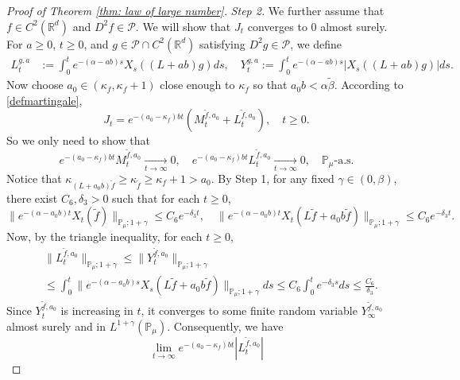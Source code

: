 \documentclass[EJP]{ejpecp} %
\begin{document}
\begin{proof}[Proof of Theorem \ref{thm: law of large number}]
  	\emph{Step 2.} We further assume that $f\in C^2(\mathbb R^d)$ and $D^2f \in \mathcal{P}$.
  	We will show that $J_t$ converges to $0$ almost surely.
	For $a \geq 0$, $ t\geq 0$, and $g\in \mathcal{P}\cap C^2(\mathbb{R}^d)$ satisfying $D^2g\in \mathcal{P}$, we define
\begin{align}
    L_t^{g,a}
    & :=\int_0^t e^{-(\alpha-ab)s}X_s((L+ab)g) ds,
    \quad
    Y_t^{g,a}
    :=\int_0^t e^{-(\alpha-ab)s}|X_s((L+ab)g)|ds.
\end{align}
	Now choose $a_0 \in (\kappa_{f}, \kappa_f + 1)$ close enough to $\kappa_f$ so that $a_0 b < \alpha \tilde \beta$.
	According to \eqref{defmartingale},
\[
    J_t
    = e^{-(a_0-\kappa_f)bt} (M_t^{\widetilde{f}, a_0}+L_t^{\widetilde{f}, a_0}),
    \quad t\geq 0.
\]
	So we only need to show that
\[
    e^{-(a_0-\kappa_f)b t}M_t^{\widetilde{f},a_0}
    \xrightarrow[t\to \infty]{} 0,
    \quad e^{-(a_0-\kappa_f)b t}L_t^{\widetilde{f},a_0}
    \xrightarrow[t\to \infty]{} 0,
    \quad \mathbb{P}_{\mu}\text{-a.s.}
\]
	Notice that $\kappa_{(L+a_0 b)\widetilde{f}}\geq \kappa_{\widetilde{f}}\geq \kappa_f+1 > a_0$.
	By Step 1, for any fixed $\gamma\in (0,\beta)$, there exist $C_6, \delta_3>0$ such that for each $t\geq 0$,
\[
    \| e^{-(\alpha-a_0 b)t} X_t(\widetilde{f})\|_{\mathbb{P}_{\mu};1+\gamma}
    \leq C_6 e^{-\delta_3 t},
    \quad \|e^{-(\alpha-a_0 b)t}X_t(L\widetilde{f}+a_0 b\widetilde{f})\|_{\mathbb{P}_{\mu};1+\gamma}
    \leq C_6 e^{-\delta_3 t}.
\]
	Now, by the triangle inequality, for each $t\geq 0$,
\begin{align}
    & \|L_t^{\widetilde{f},a_0}\|_{\mathbb{P}_{\mu};1+\gamma}
   	\leq\|Y_t^{\widetilde{f},a_0}\|_{\mathbb{P}_{\mu};1+\gamma} \\
    & \leq \int_0^t \|e^{-(\alpha-a_0 b)s}X_s( L\widetilde{f}+a_0 b\widetilde{f})\|_{\mathbb{P}_{\mu};1+\gamma}ds\leq C_6 \int_0^t e^{-\delta_3 s}ds\leq\frac{C_6}{\delta_3}.
\end{align}
	Since $Y_t^{\widetilde{f},a_0}$ is increasing in $t$, it converges to some finite random variable $Y_{\infty}^{\widetilde{f},a_0}$ almost surely and in $L^{1+\gamma}(\mathbb{P}_{\mu})$.
	Consequently,  we have
\[
    \lim_{t\rightarrow \infty}e^{-(a_0 - \kappa_f)bt}|L_t^{\widetilde{f},a_0}|
\]
\end{proof}
\end{document}
